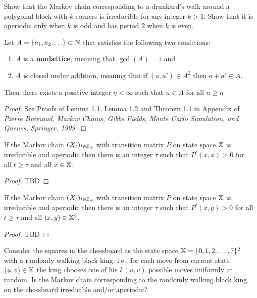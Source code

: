 \begin{exercise}\label{EXR:DrunkardsWalkOnKGonIrredAperiod}
Show that the Markov chain corresponding to a drunkard's walk around a polygonal block with $k$ corners is irreducible for any integer $k>1$.  Show that it is aperiodic only when $k$ is odd and has period $2$ when $k$ is even.
\end{exercise}

\begin{prop}\label{P:AdditionNonlattice} Let $A=\{a_1,a_2,\ldots\} \subset \mathbb{N}$ that satisfies the following two conditions:
\begin{enumerate}
\item $A$ is a {\bf nonlattice}, meaning that $\gcd(A)=1$ and
\item $A$ is closed undur addition, meaning that if $(a,a') \in A^2$ then $a+a' \in A$.
\end{enumerate}
Then there exists a positive integer $\eta < \infty$ such that $n \in A$ for all $n \geq \eta$.
\begin{proof}
See Proofs of Lemma 1.1, Lemma 1.2 and Theorem 1.1 in Appendix of {\em Pierre Br\'emaud, Markov Chains, Gibbs Fields, Monte Carlo Simulation, and Queues, Springer, 1999}.
\end{proof}
\end{prop}

\begin{prop}
If the Markov chain $(X_t)_{t\in\mathbb{Z}_+}$ with transition matrix $P$ on state space $\mathbb{X}$ is irreducible and aperiodic then there is an integer $\tau$ such that $P^t(x,x)>0$ for all $t \geq \tau$ and all $x \in \mathbb{X}$.
\begin{proof}
TBD
\end{proof}
\end{prop}

\begin{prop}
If the Markov chain $(X_t)_{t\in\mathbb{Z}_+}$ with transition matrix $P$ on state space $\mathbb{X}$ is irreducible and aperiodic then there is an integer $\tau$ such that $P^t(x,y)>0$ for all $t \geq \tau$ and all $(x,y) \in \mathbb{X}^2$.
\begin{proof}
TBD
\end{proof}
\end{prop}

\begin{exercise}\label{EXR:KingRWChessBoard}
Consider the squares in the chessboard as the state space $\mathbb{X} = \{ 0,1,2,\ldots,7\}^2$ with a randomly walking black king, i.e., for each move from current state $(u,v) \in \mathbb{X}$ the king chooses one of his $k(u,v)$ possible moves uniformly at random.  
Is the Markov chain corresponding to the randomly walking black king on the chessboard irredicible and/or aperiodic?  
\end{exercise}

